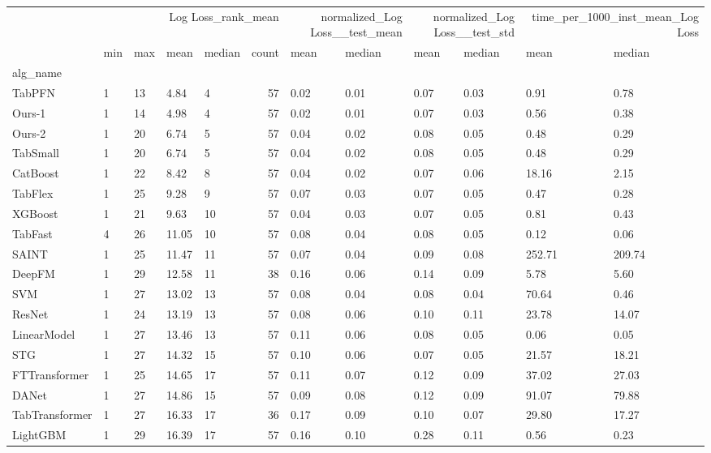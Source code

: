 \begin{tabular}{lllllrllllll}
\toprule
 & \multicolumn{5}{r}{Log Loss_rank_mean} & \multicolumn{2}{r}{normalized_Log Loss__test_mean} & \multicolumn{2}{r}{normalized_Log Loss__test_std} & \multicolumn{2}{r}{time_per_1000_inst_mean_Log Loss} \\
 & min & max & mean & median & count & mean & median & mean & median & mean & median \\
alg_name &  &  &  &  &  &  &  &  &  &  &  \\
\midrule
TabPFN & 1 & 13 & 4.84 & 4 & 57 & 0.02 & 0.01 & 0.07 & 0.03 & 0.91 & 0.78 \\
Ours-1 & 1 & 14 & 4.98 & 4 & 57 & 0.02 & 0.01 & 0.07 & 0.03 & 0.56 & 0.38 \\
Ours-2 & 1 & 20 & 6.74 & 5 & 57 & 0.04 & 0.02 & 0.08 & 0.05 & 0.48 & 0.29 \\
TabSmall & 1 & 20 & 6.74 & 5 & 57 & 0.04 & 0.02 & 0.08 & 0.05 & 0.48 & 0.29 \\
CatBoost & 1 & 22 & 8.42 & 8 & 57 & 0.04 & 0.02 & 0.07 & 0.06 & 18.16 & 2.15 \\
TabFlex & 1 & 25 & 9.28 & 9 & 57 & 0.07 & 0.03 & 0.07 & 0.05 & 0.47 & 0.28 \\
XGBoost & 1 & 21 & 9.63 & 10 & 57 & 0.04 & 0.03 & 0.07 & 0.05 & 0.81 & 0.43 \\
TabFast & 4 & 26 & 11.05 & 10 & 57 & 0.08 & 0.04 & 0.08 & 0.05 & 0.12 & 0.06 \\
SAINT & 1 & 25 & 11.47 & 11 & 57 & 0.07 & 0.04 & 0.09 & 0.08 & 252.71 & 209.74 \\
DeepFM & 1 & 29 & 12.58 & 11 & 38 & 0.16 & 0.06 & 0.14 & 0.09 & 5.78 & 5.60 \\
SVM & 1 & 27 & 13.02 & 13 & 57 & 0.08 & 0.04 & 0.08 & 0.04 & 70.64 & 0.46 \\
ResNet & 1 & 24 & 13.19 & 13 & 57 & 0.08 & 0.06 & 0.10 & 0.11 & 23.78 & 14.07 \\
LinearModel & 1 & 27 & 13.46 & 13 & 57 & 0.11 & 0.06 & 0.08 & 0.05 & 0.06 & 0.05 \\
STG & 1 & 27 & 14.32 & 15 & 57 & 0.10 & 0.06 & 0.07 & 0.05 & 21.57 & 18.21 \\
FTTransformer & 1 & 25 & 14.65 & 17 & 57 & 0.11 & 0.07 & 0.12 & 0.09 & 37.02 & 27.03 \\
DANet & 1 & 27 & 14.86 & 15 & 57 & 0.09 & 0.08 & 0.12 & 0.09 & 91.07 & 79.88 \\
TabTransformer & 1 & 27 & 16.33 & 17 & 36 & 0.17 & 0.09 & 0.10 & 0.07 & 29.80 & 17.27 \\
LightGBM & 1 & 29 & 16.39 & 17 & 57 & 0.16 & 0.10 & 0.28 & 0.11 & 0.56 & 0.23 \\

\end{tabular}
